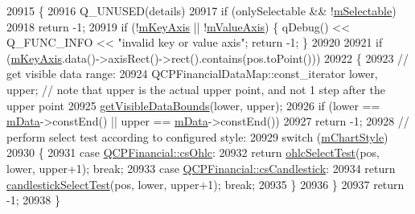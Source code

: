\begin{DoxyCode}
20915 \{
20916   Q\_UNUSED(details)
20917   if (onlySelectable && !\hyperlink{class_q_c_p_abstract_plottable_aceee52342c8e75727abcbd164986fdcb}{mSelectable})
20918     return -1;
20919   if (!\hyperlink{class_q_c_p_abstract_plottable_a426f42e254d0f8ce5436a868c61a6827}{mKeyAxis} || !\hyperlink{class_q_c_p_abstract_plottable_a2901452ca4aea911a1827717934a4bda}{mValueAxis}) \{ qDebug() << Q\_FUNC\_INFO << \textcolor{stringliteral}{"invalid key or value axis"};
       \textcolor{keywordflow}{return} -1; \}
20920   
20921   \textcolor{keywordflow}{if} (\hyperlink{class_q_c_p_abstract_plottable_a426f42e254d0f8ce5436a868c61a6827}{mKeyAxis}.data()->axisRect()->rect().contains(pos.toPoint()))
20922   \{
20923     \textcolor{comment}{// get visible data range:}
20924     QCPFinancialDataMap::const\_iterator lower, upper; \textcolor{comment}{// note that upper is the actual upper point, and not
       1 step after the upper point}
20925     \hyperlink{class_q_c_p_financial_aca2edf9f19fae733cdb6bd4549019b84}{getVisibleDataBounds}(lower, upper);
20926     \textcolor{keywordflow}{if} (lower == \hyperlink{class_q_c_p_financial_a475f63587ca1077d8c30aaf2b71ae026}{mData}->constEnd() || upper == \hyperlink{class_q_c_p_financial_a475f63587ca1077d8c30aaf2b71ae026}{mData}->constEnd())
20927       \textcolor{keywordflow}{return} -1;
20928     \textcolor{comment}{// perform select test according to configured style:}
20929     \textcolor{keywordflow}{switch} (\hyperlink{class_q_c_p_financial_ab65c2ce8d6354451870bb44b894c1e92}{mChartStyle})
20930     \{
20931       \textcolor{keywordflow}{case} \hyperlink{class_q_c_p_financial_a0f800e21ee98d646dfc6f8f89d10ebfba3a516016c9298d3e95dd82aa203c4390}{QCPFinancial::csOhlc}:
20932         \textcolor{keywordflow}{return} \hyperlink{class_q_c_p_financial_a9c7d79351e728a67bfb6821c1d1bd6c0}{ohlcSelectTest}(pos, lower, upper+1); \textcolor{keywordflow}{break};
20933       \textcolor{keywordflow}{case} \hyperlink{class_q_c_p_financial_a0f800e21ee98d646dfc6f8f89d10ebfbac803cbd39f26e3f206bcc7028679e62f}{QCPFinancial::csCandlestick}:
20934         \textcolor{keywordflow}{return} \hyperlink{class_q_c_p_financial_abd0137244a17d5486a01ee442b083333}{candlestickSelectTest}(pos, lower, upper+1); \textcolor{keywordflow}{break};
20935     \}
20936   \}
20937   \textcolor{keywordflow}{return} -1;
20938 \}
\end{DoxyCode}


